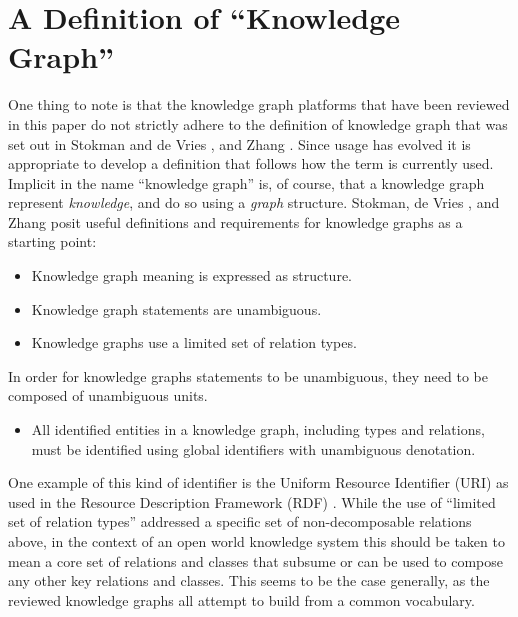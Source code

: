 \section{A Definition of ``Knowledge Graph''}

One thing to note is that the knowledge graph platforms that have been reviewed in this paper do not strictly adhere to the definition of knowledge graph that was set out in Stokman and de Vries \cite{Stokman_1988}, and Zhang \cite{zhang2002knowledge}.
Since usage has evolved it is appropriate to develop a definition that follows how the term is currently used.
Implicit in the name ``knowledge graph'' is, of course, that a knowledge graph represent \emph{knowledge}, and do so using a \emph{graph} structure.
Stokman,  de Vries \cite{Stokman_1988}, and Zhang \cite{zhang2002knowledge} posit useful definitions and requirements for knowledge graphs as a starting point:

\begin {itemize}
\item Knowledge graph meaning is expressed as structure.
\item Knowledge graph statements are unambiguous.
\item Knowledge graphs use a limited set of relation types.
\end {itemize}

In order for knowledge graphs statements to be unambiguous, they need to be composed of unambiguous units. 
\begin {itemize}
\item All identified entities in a knowledge graph, including types and relations, must be identified using global identifiers with unambiguous denotation.
\end {itemize}
One example of this kind of identifier is the Uniform Resource Identifier (URI) as used in the Resource Description Framework (RDF) \cite{cyganiak2014rdf}.
While the use of ``limited set of relation types'' addressed a specific set of non-decomposable relations above, in the context of an open world knowledge system this should be taken to mean a core set of relations and classes that subsume or can be used to compose any other key relations and classes.   
This seems to be the case generally, as the reviewed knowledge graphs all attempt to build from a common vocabulary.

